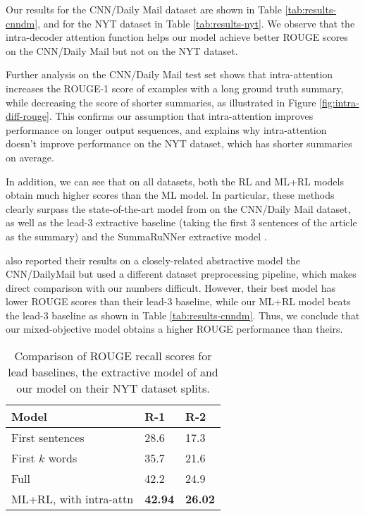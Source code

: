 \documentclass{article} \usepackage{iclr2018_arxiv,times}
\begin{document}
Our results for the CNN/Daily Mail dataset are shown in Table \ref{tab:results-cnndm}, and for the NYT dataset in Table \ref{tab:results-nyt}. We observe that the intra-decoder attention function helps our model achieve better ROUGE scores on the CNN/Daily Mail but not on the NYT dataset.

Further analysis on the CNN/Daily Mail test set shows that intra-attention increases the ROUGE-1 score of examples with a long ground truth summary, while decreasing the score of shorter summaries, as illustrated in Figure \ref{fig:intra-diff-rouge}. This confirms our assumption that intra-attention improves performance on longer output sequences, and explains why intra-attention doesn’t improve performance on the NYT dataset, which has shorter summaries on average.

In addition, we can see that on all datasets, both the RL and ML+RL models obtain much higher scores than the ML model. In particular, these methods clearly surpass the state-of-the-art model from \citet{nallapati2016} on the CNN/Daily Mail dataset, as well as the lead-3 extractive baseline (taking the first 3 sentences of the article as the summary) and the SummaRuNNer extractive model \citep{nallapati2017}.

\citet{see2017} also reported their results on a closely-related abstractive model the CNN/DailyMail but used a different dataset preprocessing pipeline, which makes direct comparison with our numbers difficult. However, their best model has lower ROUGE scores than their lead-3 baseline, while our ML+RL model beats the lead-3 baseline as shown in Table \ref{tab:results-cnndm}. Thus, we conclude that our mixed-objective model obtains a higher ROUGE performance than theirs.

\begin{table}
\centering
\begin{tabular}{|l|l|l|}
\hline
{\bf Model} & {\bf R-1} & {\bf R-2} \\\hline
First sentences & 28.6 & 17.3\\
First $k$ words & 35.7 & 21.6\\\hline
Full \citep{durrett2016learning} & 42.2 & 24.9\\\hline
ML+RL, with intra-attn & \bf 42.94 & \bf 26.02 \\\hline
\end{tabular}
\caption{Comparison of ROUGE recall scores for lead baselines, the extractive model of \protect\citet{durrett2016learning} and our model on their NYT dataset splits.}
\label{tab:nyt-baseline-results}
\end{table}
\end{document}

